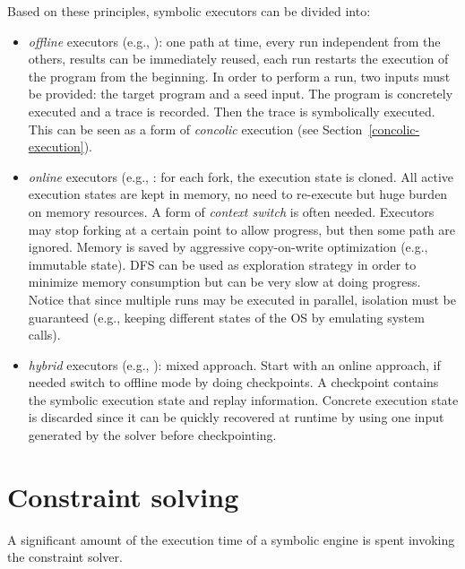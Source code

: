 Based on these principles, symbolic executors can be divided into:

\begin{itemize}
  \item {\em offline} executors (e.g., \cite{SAGE-NDSS08}): one path at time, every run independent from the others, results can be immediately reused, each run restarts the execution of the program from the beginning. In order to perform a run, two inputs must be provided: the target program and a seed input. The program is concretely executed and a trace is recorded. Then the trace is symbolically executed. This can be seen as a form of {\em concolic} execution (see Section~\ref{concolic-execution}).
  \item {\em online} executors (e.g., \cite{KLEE-OSDI08,CKC-TOCS12,AEG-NDSS11}: for each fork, the execution state is cloned. All active execution states are kept in memory, no need to re-execute but huge burden on memory resources. A form of {\em context switch} is often needed. Executors may stop forking at a certain point to allow progress, but then some path are ignored. Memory is saved by aggressive copy-on-write optimization (e.g., immutable state). DFS can be used as exploration strategy in order to minimize memory consumption but can be very slow at doing progress. Notice that since multiple runs may be executed in parallel, isolation must be guaranteed (e.g., keeping different states of the OS by emulating system calls).
  \item {\em hybrid} executors (e.g., \cite{MAYHEM-SP12}): mixed approach. Start with an online approach, if needed switch to offline mode by doing checkpoints. A checkpoint contains the symbolic execution state and replay information. Concrete execution state is discarded since it can be quickly recovered at runtime by using one input generated by the solver before checkpointing.
\end{itemize}


\section{Constraint solving}

A significant amount of the execution time of a symbolic engine is spent invoking the constraint solver.


